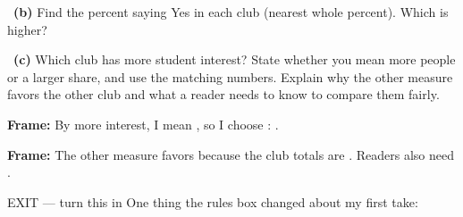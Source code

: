 \documentclass[11pt]{article}
\begin{document}
~\textbf{(b)} Find the percent saying Yes in each club (nearest whole percent). Which is higher?\par
\workspace{1.4in}

~\textbf{(c)} Which club has more student interest? State whether you mean more people or a larger share, and use the matching numbers. Explain why the other measure favors the other club and what a reader needs to know to compare them fairly.\par
\workspace{2.0in}

\begin{sentenceframebox}\raggedright\textbf{Frame:} By more interest, I mean \blank[1.5in], so I choose \blank[0.9in]: \blank[1.8in].\end{sentenceframebox}

\begin{sentenceframebox}\raggedright\textbf{Frame:} The other measure favors \blank[0.9in] because the club totals are \blank[1.4in]. Readers also need \blank[1.5in].\end{sentenceframebox}

\begin{summaryexitbox}{EXIT --- turn this in}
One thing the rules box changed about my first take: \hrulefill\par
\workspace{0.4in}
\end{summaryexitbox}
\end{document}
